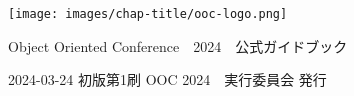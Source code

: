 \clearpage{\thispagestyle{empty}}
\begin{center}

\texttt{[image: images/chap-title/ooc-logo.png]}
\vspace{80pt}

\begin{sffamily}
\Large
Object Oriented Conference　2024　公式ガイドブック
\normalsize
\end{sffamily}
\vspace{80pt}

\begin{sffamily}
2024-03-24
\hspace{5pt}
初版第1刷
\hspace{5pt}
OOC 2024　実行委員会
\hspace{5pt}
発行
\end{sffamily}

\end{center}
